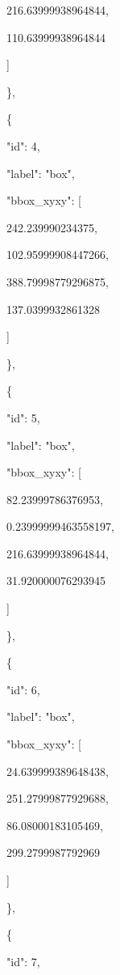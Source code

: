 \documentclass[10pt,a4paper]{article}
\begin{document}
        216.63999938964844,\allowbreak{}\par
        110.63999938964844\par
      ]\par
    \},\allowbreak{}\par
    \{\par
      "id":\allowbreak{} 4,\allowbreak{}\par
      "label":\allowbreak{} "box",\allowbreak{}\par
      "bbox\_xyxy":\allowbreak{} [\par
        242.239990234375,\allowbreak{}\par
        102.95999908447266,\allowbreak{}\par
        388.79998779296875,\allowbreak{}\par
        137.0399932861328\par
      ]\par
    \},\allowbreak{}\par
    \{\par
      "id":\allowbreak{} 5,\allowbreak{}\par
      "label":\allowbreak{} "box",\allowbreak{}\par
      "bbox\_xyxy":\allowbreak{} [\par
        82.23999786376953,\allowbreak{}\par
        0.23999999463558197,\allowbreak{}\par
        216.63999938964844,\allowbreak{}\par
        31.920000076293945\par
      ]\par
    \},\allowbreak{}\par
    \{\par
      "id":\allowbreak{} 6,\allowbreak{}\par
      "label":\allowbreak{} "box",\allowbreak{}\par
      "bbox\_xyxy":\allowbreak{} [\par
        24.639999389648438,\allowbreak{}\par
        251.27999877929688,\allowbreak{}\par
        86.08000183105469,\allowbreak{}\par
        299.2799987792969\par
      ]\par
    \},\allowbreak{}\par
    \{\par
      "id":\allowbreak{} 7,\allowbreak{}\par
\end{document}
